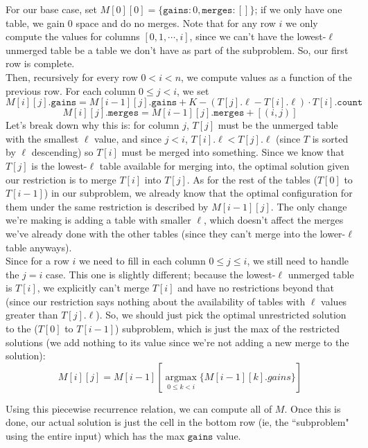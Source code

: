 \documentclass{article}[12]
\begin{document}
For our base case, set $M[0][0] = \{\texttt{gains}: 0, \texttt{merges}: []\}$; if we only have one table, we gain 0 space and do no merges. Note that for any row $i$ we only compute the values for columns $[0, 1, \cdots, i]$, since we can't have the lowest-$\ell$ unmerged table be a table we don't have as part of the subproblem. So, our first row is complete.\\

Then, recursively for every row $0 < i < n$, we compute values as a function of the previous row. For each column $0 \le j < i$, we set
$$M[i][j].\texttt{gains} = M[i-1][j].\texttt{gains} + K - (T[j].\ell - T[i].\ell) \cdot T[i].\texttt{count}$$
$$M[i][j].\texttt{merges} = M[i-1][j].\texttt{merges} + [ (i, j) ]$$
Let's break down why this is: for column $j$, $T[j]$ must be the unmerged table with the smallest $\ell$ value, and since $j < i$, $T[i].\ell < T[j].\ell$ (since $T$ is sorted by $\ell$ descending) so $T[i]$ must be merged into something. Since we know that $T[j]$ is the lowest-$\ell$ table available for merging into, the optimal solution given our restriction is to merge $T[i]$ into $T[j]$. As for the rest of the tables ($T[0]$ to $T[i-1]$) in our subproblem, we already know that the optimal configuration for them under the same restriction is described by $M[i-1][j]$. The only change we're making is adding a table with smaller $\ell$, which doesn't affect the merges we've already done with the other tables (since they can't merge into the lower-$\ell$ table anyways).\\

Since for a row $i$ we need to fill in each column $0 \le j \le i$, we still need to handle the $j = i$ case. This one is slightly different; because the lowest-$\ell$ unmerged table is $T[i]$, we explicitly can't merge $T[i]$ and have no restrictions beyond that (since our restriction says nothing about the availability of tables with $\ell$ values greater than $T[j].\ell$). So, we should just pick the optimal unrestricted solution to the ($T[0]$ to $T[i-1]$) subproblem, which is just the max of the restricted solutions (we add nothing to its value since we're not adding a new merge to the solution):
$$M[i][j] = M[i-1][\underset{0 \le k < i}{\operatorname{argmax}} \{ M[i-1][k].gains \}]$$

Using this piecewise recurrence relation, we can compute all of $M$. Once this is done, our actual solution is just the cell in the bottom row (ie, the ``subproblem" using the entire input) which has the max $\texttt{gains}$ value.
\end{document}
